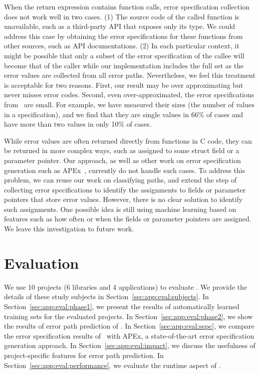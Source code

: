 \documentclass[12pt]{report}	%
\begin{document}
When the return expression 
contains function calls, error specification collection
does not work well in two cases. 
%
(1) The source
code of the called function is unavailable, such as a third-party
API that exposes only its type. 
%
We could address this case 
by obtaining the error specifications for these functions from other sources, such
as API documentations.
%
(2) In each particular context,
it might be possible that only a subset of the 
error specification of the callee will become that
of the caller
while our implementation includes the full set
as the error values are collected from all error paths. 
%
%
Nevertheless, we feel this treatment is acceptable for
two reasons. First, our result may be over approximating but never
misses error codes. Second, even over-approximated, 
the error specifications from \newTool\ are small. 
For example, we have measured
their sizes (the number of values in a specification), 
and we find that they are single values in 66\% of cases
and have more than two values in only 10\% of cases. 

While error values are often returned directly from
functions in C code, they can be returned in more complex
ways, such as assigned to some struct field or a parameter
pointer. Our approach, as well as 
other work on error specification generation such as
APEx~\cite{Kang:2016:AAI:2970276.2970354},
currently do not handle such cases.
%
To address this problem,
we can reuse our work on classifying paths,
and extend the step of collecting error specifications
to identify the assignments to fields or
parameter pointers that store error values.
%
However, there is no clear solution to identify such assignments. 
One possible idea is still using machine learning based on features such
as how often or when the fields or parameter pointers are assigned.
We leave this investigation to future work. 

\section{Evaluation}
\label{sec:app:eval}

We use 10 projects (6 libraries 
and 4 applications) to evaluate \newTool.
We provide the details of these study subjects in Section~\ref{sec:app:eval:subjects}.
In Section~\ref{sec:app:eval:phase1}, we present the results of automatically learned training sets for the evaluated projects.
In Section~\ref{sec:app:eval:phase2}, we show the results of error path prediction of \newTool.
In Section~\ref{sec:app:eval:sepc}, we compare the error specification results of \newTool\ with APEx, a
state-of-the-art error specification generation approach.
In Section~\ref{sec:app:eval:impact}, we discuss the usefulness of project-specific features for error path prediction.
In Section~\ref{sec:app:eval:performance}, we evaluate the runtime aspect of \newTool.
\end{document}
